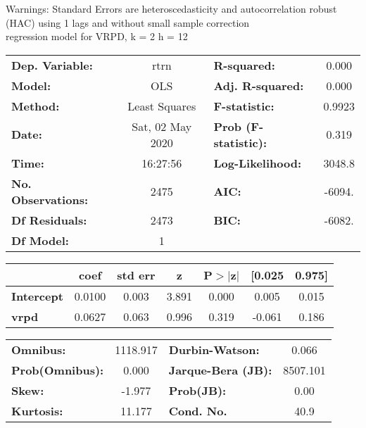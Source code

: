 Warnings: \newline
 [1] Standard Errors are heteroscedasticity and autocorrelation robust (HAC) using 1 lags and without small sample correction\\ 

regression model for VRPD, k = 2 h = 12\begin{center}
\begin{tabular}{lclc}
\toprule
\textbf{Dep. Variable:}    &       rtrn       & \textbf{  R-squared:         } &     0.000   \\
\textbf{Model:}            &       OLS        & \textbf{  Adj. R-squared:    } &     0.000   \\
\textbf{Method:}           &  Least Squares   & \textbf{  F-statistic:       } &    0.9923   \\
\textbf{Date:}             & Sat, 02 May 2020 & \textbf{  Prob (F-statistic):} &    0.319    \\
\textbf{Time:}             &     16:27:56     & \textbf{  Log-Likelihood:    } &    3048.8   \\
\textbf{No. Observations:} &        2475      & \textbf{  AIC:               } &    -6094.   \\
\textbf{Df Residuals:}     &        2473      & \textbf{  BIC:               } &    -6082.   \\
\textbf{Df Model:}         &           1      & \textbf{                     } &             \\
\bottomrule
\end{tabular}
\begin{tabular}{lcccccc}
                   & \textbf{coef} & \textbf{std err} & \textbf{z} & \textbf{P$> |$z$|$} & \textbf{[0.025} & \textbf{0.975]}  \\
\midrule
\textbf{Intercept} &       0.0100  &        0.003     &     3.891  &         0.000        &        0.005    &        0.015     \\
\textbf{vrpd}      &       0.0627  &        0.063     &     0.996  &         0.319        &       -0.061    &        0.186     \\
\bottomrule
\end{tabular}
\begin{tabular}{lclc}
\textbf{Omnibus:}       & 1118.917 & \textbf{  Durbin-Watson:     } &    0.066  \\
\textbf{Prob(Omnibus):} &   0.000  & \textbf{  Jarque-Bera (JB):  } & 8507.101  \\
\textbf{Skew:}          &  -1.977  & \textbf{  Prob(JB):          } &     0.00  \\
\textbf{Kurtosis:}      &  11.177  & \textbf{  Cond. No.          } &     40.9  \\
\bottomrule
\end{tabular}
\end{center}

